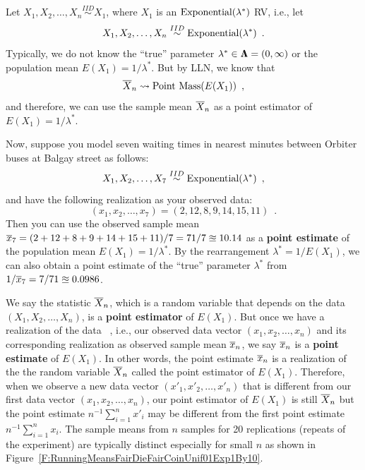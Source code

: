 \begin{example}\label{Eg:LLNExponential}
Let $X_1,X_2,\ldots, X_n \overset{IID}{\sim} X_1$, where $X_1$ is an $\mbox{{\rm Exponential}}(\lambda^*)$ RV, i.e., let
\[
X_1,X_2,\ldots, X_n \overset{IID}{\sim} \mbox{{\rm Exponential}}(\lambda^*) \enspace .
\]
Typically, we do not know the ``true'' parameter $\lambda^* \in {\Lambda}\mspace{-11 mu}{\Lambda} = (0,\infty)$ or the population mean $E(X_1) = 1/\lambda^*$.  
But by LLN, we know that
\[
\overline{X}_n \rightsquigarrow \mbox{{\rm Point~Mass}}(E(X_1)) \enspace ,
\]
and therefore, we can use the sample mean $\overline{X}_n$ as a point estimator of $E(X_1)= 1/\lambda^*$.  

Now, suppose you model seven waiting times in nearest minutes between Orbiter buses at Balgay street as follows:
\[
X_1,X_2,\ldots, X_7 \overset{IID}{\sim} \mbox{{\rm Exponential}}(\lambda^*) \enspace ,
\]
and have the following realization as your observed data:
\[
(x_1,x_2,\ldots,x_7) = (2,12,8,9,14,15,11) \enspace .
\]
Then you can use the observed sample mean $\overline{x}_7=(2+12+8+9+14+15+11)/7=71/7 \approxeq 10.14$ as a {\bf point estimate} of the population mean $E(X_1)=1/\lambda^*$.  
By the rearrangement $\lambda^*=1/E(X_1)$, we can also obtain a point estimate of the ``true'' parameter $\lambda^*$ from $1/\overline{x}_7=7/71 \approxeq 0.0986$. 
\end{example}

\begin{rem}
We say the statistic $\overline{X}_n$, which is a random variable that depends on the data \rv~$(X_1,X_2,\ldots,X_n)$, is a {\bf point estimator} of $E(X_1)$.  
But once we have a realization of the data \rv~, i.e., our observed data vector $(x_1,x_2,\ldots,x_n)$ and its corresponding realization as observed sample mean $\overline{x}_n$, we say $\overline{x}_n$ is a {\bf point estimate} of $E(X_1)$.  In other words, the point estimate $\overline{x}_n$ is a realization of the the random variable $\overline{X}_n$ called the point estimator of $E(X_1)$.  
Therefore, when we observe a new data vector $(x'_1,x'_2,\ldots,x'_n)$  that is different from our first data vector $(x_1,x_2,\ldots,x_n)$, our point estimator of $E(X_1)$ is still $\overline{X}_n$ but the point estimate $n^{-1}\sum_{i=1}^nx'_i$ may be different from the first point estimate $n^{-1}\sum_{i=1}^nx_i$.  The sample means from $n$ samples for 20 replications (repeats of the experiment) are typically distinct especially for small $n$ as shown in Figure~\ref{F:RunningMeansFairDieFairCoinUnif01Exp1By10}.
\end{rem}

